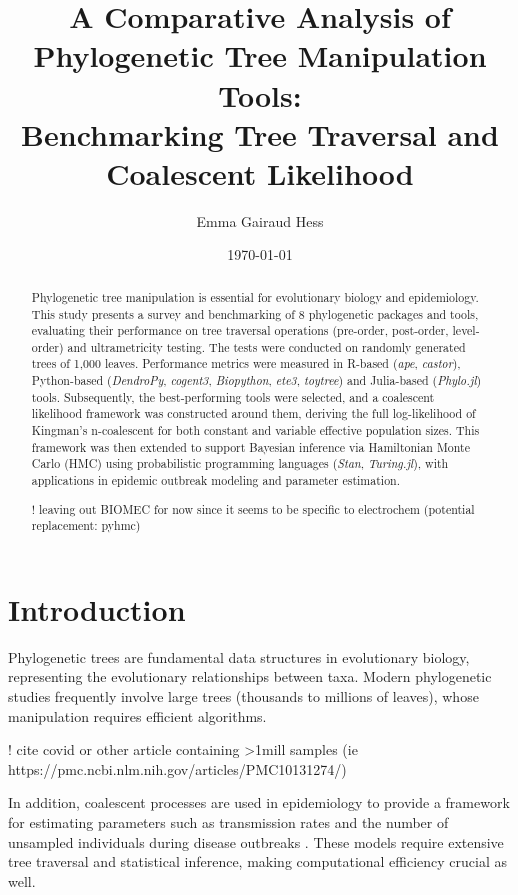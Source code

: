 \documentclass[11pt, a4paper]{article}
\title{A Comparative Analysis of Phylogenetic Tree Manipulation Tools: \\
Benchmarking Tree Traversal and Coalescent Likelihood}
\author{Emma Gairaud Hess}
\date{\today}
\newcommand{\ape}{\textit{ape}}
\newcommand{\dendropy}{\textit{DendroPy}}
\newcommand{\cogent}{\textit{cogent3}}
\newcommand{\biopython}{\textit{Biopython}}
\newcommand{\ete}{\textit{ete3}}
\newcommand{\toytree}{\textit{toytree}}
\newcommand{\phylo}{\textit{Phylo.jl}}
\newcommand{\castor}{\textit{castor}}
\newcommand{\stan}{\textit{Stan}}
\newcommand{\turing}{\textit{Turing.jl}}
\begin{document}
\maketitle

\begin{abstract}

Phylogenetic tree manipulation is essential for evolutionary biology and epidemiology.
This study presents a survey and benchmarking of 8 phylogenetic packages and tools,
evaluating their performance on tree traversal operations (pre-order, post-order, level-order) and ultrametricity testing.
The tests were conducted on randomly generated trees of 1{,}000 leaves.
Performance metrics were measured in R-based (\ape, \castor), Python-based
(\dendropy, \cogent, \biopython, \ete, \toytree) and Julia-based (\phylo) tools.
Subsequently, the best-performing tools were selected, and a coalescent likelihood framework was constructed around them, deriving the full log-likelihood of Kingman's n-coalescent for both constant and variable effective population sizes. 
This framework was then extended to support Bayesian inference via Hamiltonian Monte Carlo (HMC) using probabilistic programming languages (\stan, \turing), with applications in epidemic outbreak modeling and parameter estimation.

! leaving out BIOMEC for now since it seems to be specific to electrochem (potential replacement: pyhmc)
\end{abstract}

\newpage
\tableofcontents
\newpage

\section{Introduction}

Phylogenetic trees are fundamental data structures in evolutionary biology, representing the evolutionary relationships between taxa. Modern phylogenetic studies frequently involve large trees (thousands to millions of leaves), whose manipulation requires efficient algorithms.

! cite covid or other article containing >1mill samples (ie https://pmc.ncbi.nlm.nih.gov/articles/PMC10131274/)

In addition, coalescent processes are used in epidemiology to provide a framework for estimating parameters such as transmission rates and the number of unsampled individuals during disease outbreaks \cite{volz2009,pybus2001}. These models require extensive tree traversal and statistical inference, making computational efficiency crucial as well.
\end{document}
